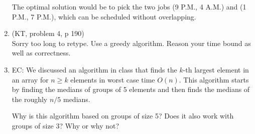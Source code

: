 \documentclass[11pt]{article}
\begin{document}
\begin{enumerate}
The optimal solution would be to pick the two jobs (9 P.M., 4 A.M.) and (1 P.M., 7 P.M.), which can be scheduled without overlapping.

\vspace*{.2cm}
\item (KT, problem 4, p 190)\\
Sorry too long to retype. Use a greedy algorithm.
Reason your time bound as well as correctness.

\vspace*{.2cm}
\item EC: We discussed an algorithm in class
that finds the $k$-th largest element in an array for $n\ge
k$ elements in worst case time $O(n)$. This algorithm
starts by finding the medians of groups of 5 elements and
then finds the medians of the roughly $n/5$ medians.

Why is this algorithm based on groups of size 5?
Does it also work with groups of size 3? Why or why not?
\end{enumerate}
\end{document}
